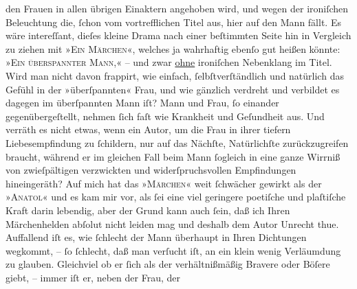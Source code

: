 \begin{ledgroupsized}[t]{13cm}
               den Frauen {\pb}in allen übrigen Einaktern
               angehoben wird, und wegen der ironiſchen Beleuchtung die, ſchon vom vortrefflichen
               Titel aus, hier auf den Mann fällt. Es wäre intereſſant, dieſes kleine Drama nach
               einer beſtimmten Seite hin in Vergleich zu ziehen mit »\textsc{Ein Märchen}«, welches ja wahrhaftig ebenſo gut heißen könnte: »\textsc{Ein
                  überspannter Mann},« – und zwar \uline{ohne}
               ironiſchen Nebenklang im Titel. Wird man nicht davon frappirt, wie einfach,
               ſelbſtverſtändlich und natürlich das Gefühl in der »überſpannten« Frau, und wie
               gänzlich verdreht und verbildet es dagegen im überſpannten Mann iſt? Mann und Frau,
               ſo einander gegenübergeſtellt, nehmen ſich faſt wie Krankheit und Geſundheit aus. Und
               verräth es nicht etwas, wenn ein Autor, um die Frau
               in ihrer tiefern Liebesempfindung zu ſchildern, nur auf das Nächſte, Natürlichſte
               zurückzugreifen braucht, während er im gleichen Fall beim Mann ſogleich in {\pb}eine ganze Wirrniß von zwieſpältigen
               verzwickten und widerſpruchsvollen Empfindungen hineingeräth? Auf mich hat das »\textsc{Märchen}« weit ſchwächer gewirkt als der »\textsc{Anatol}« und es kam mir vor, als ſei eine viel geringere poetiſche und plaſtiſche Kraft
               darin lebendig, aber der Grund kann auch ſein, daß ich Ihren Märchenhelden abſolut
               nicht leiden mag und deshalb dem Autor Unrecht thue. Auffallend iſt es, wie ſchlecht
               der Mann überhaupt in Ihren Dichtungen wegkommt, – ſo ſchlecht, daß man verſucht iſt,
               an ein klein wenig Verläumdung zu glauben. Gleichviel ob er ſich als der
               verhältnißmäßig Bravere oder Böſere giebt, – immer iſt er, neben der Frau, der

\end{ledgroupsized}
